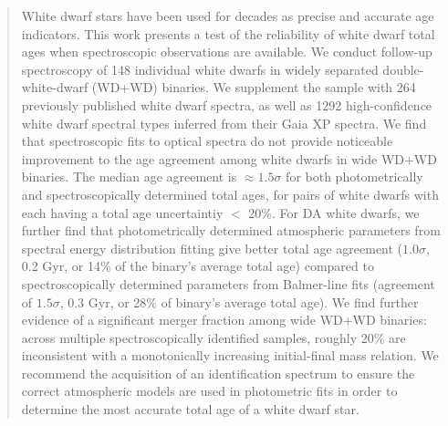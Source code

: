 \documentclass[twocolumn]{aastex631}
\begin{document}
\begin{abstract}
White dwarf stars have been used for decades as precise and accurate age indicators. This work presents a test of the reliability of white dwarf total ages when spectroscopic observations are available. We conduct follow-up spectroscopy of 148 individual white dwarfs in widely separated double-white-dwarf (WD+WD) binaries. We supplement the sample with 264 previously published white dwarf spectra, as well as 1292 high-confidence white dwarf spectral types inferred from their Gaia XP spectra. We find that spectroscopic fits to optical spectra do not provide noticeable improvement to the age agreement among white dwarfs in wide WD+WD binaries. The median age agreement is $\approx$$1.5\sigma$ for both photometrically and spectroscopically determined total ages, for pairs of white dwarfs with each having a total age uncertaintiy $<$ 20\%. For DA white dwarfs, we further find that photometrically determined atmospheric parameters from spectral energy distribution fitting give better total age agreement ($1.0\sigma$, 0.2 Gyr, or 14\% of the binary's average total age) compared to spectroscopically determined parameters from Balmer-line fits (agreement of $1.5\sigma$, 0.3 Gyr, or 28\% of binary's average total age). We find further evidence of a significant merger fraction among wide WD+WD binaries: across multiple spectroscopically identified samples, roughly 20\% are inconsistent with a monotonically increasing initial-final mass relation. We recommend the acquisition of an identification spectrum to ensure the correct atmospheric models are used in photometric fits in order to determine the most accurate total age of a white dwarf star.
\end{abstract}

\end{document}
